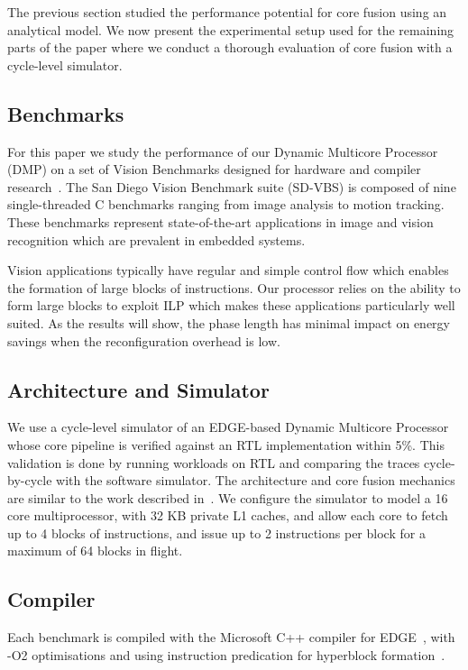 The previous section studied the performance potential for core fusion using an analytical model.
We now present the experimental setup used for the remaining parts of the paper where we conduct a thorough evaluation of core fusion with a cycle-level simulator.

\subsection{Benchmarks}

For this paper we study the performance of our Dynamic Multicore Processor (DMP) on a set of Vision Benchmarks designed for hardware and compiler research~\cite{sdvbs}.
The San Diego Vision Benchmark suite (SD-VBS) is composed of nine single-threaded C benchmarks ranging from image analysis to motion tracking.
These benchmarks represent state-of-the-art applications in image and vision recognition which are prevalent in embedded systems.

Vision applications typically have regular and simple control flow which enables the formation of large blocks of instructions.
Our processor relies on the ability to form large blocks to exploit ILP which makes these applications particularly well suited.
As the results will show, the phase length has minimal impact on energy savings when the reconfiguration overhead is low.

\subsection{Architecture and Simulator}

We use a cycle-level simulator of an EDGE-based Dynamic Multicore Processor~\cite{e2} whose core pipeline is verified against an RTL implementation within 5\%. 
This validation is done by running workloads on RTL and comparing the traces cycle-by-cycle with the software simulator.
The architecture and core fusion mechanics are similar to the work described in~\cite{kim2007tflex,putnam2010e2}.
We configure the simulator to model a 16 core multiprocessor, with 32 KB private L1 caches, and allow each core to fetch up to 4 blocks of instructions, 
and issue up to 2 instructions per block for a maximum of 64 blocks in flight.


\subsection{Compiler}
Each benchmark is compiled with the Microsoft C++ compiler for EDGE~\cite{e2}, with -O2 optimisations and using instruction predication for hyperblock formation~\cite{smith2006edge}.

